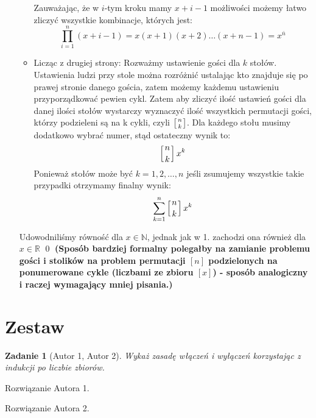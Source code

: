 \documentclass{mwart}
\newtheorem{zad}{Zadanie}[section]
\begin{document}
\begin{mdframed}
\begin{enumerate}
\begin{itemize}
              Zauważając, że w $i$-tym kroku mamy $x+i-1$ możliwości możemy 
              łatwo zliczyć wszystkie kombinacje, których jest:
            \[{\displaystyle \prod_{i=1}^{n} (x+i-1)} = x(x+1)(x+2)\dots(x+n-1) = x^{\bar{n}}\]
            \item Licząc z drugiej strony:
            Rozważmy ustawienie gości dla $k$ stołów. Ustawienia ludzi przy stole można rozróżnić ustalając kto znajduje się po prawej stronie danego gościa, zatem możemy każdemu ustawieniu przyporządkować pewien cykl.
            Zatem aby zliczyć ilość ustawień gości dla danej ilości stołów wystarczy wyznaczyć ilość wszystkich permutacji gości, którzy podzieleni są na k cykli, czyli  \(\left[n \atop k \right]\). Dla każdego stołu musimy dodatkowo wybrać numer, stąd ostateczny wynik to:
            \[\left[n \atop k \right] x^k\]
            Ponieważ stołów może być \(k = 1,2,\dots, n\) jeśli zsumujemy wszystkie takie przypadki otrzymamy finalny wynik:
            \[\sum_{k=1}^{n} \left[n \atop k \right] x^k\]
        \end{itemize}
        \bigskip
        Udowodniliśmy równość dla \( x \in \mathbb{N} \), jednak jak w 1. zachodzi ona również dla \( x \in \mathbb{R} \)
        \qed \bigskip
        \newline \textbf{(Sposób bardziej formalny polegałby na zamianie problemu gości i stolików na problem permutacji \(\left[ n \right] \) podzielonych na ponumerowane cykle (liczbami ze zbioru \(\left[ x \right] \)) - sposób analogiczny i raczej wymagający mniej pisania.)}
    \end{enumerate}
\end{mdframed}















\newpage
\section{Zestaw}          %

\begin{zad}[Autor 1, Autor 2]
    Wykaż zasadę włączeń i wyłączeń korzystając z indukcji po liczbie zbiorów.
\end{zad}
\begin{mdframed}
    Rozwiązanie Autora 1.
\end{mdframed}
\begin{mdframed}
    Rozwiązanie Autora 2.
\end{mdframed}
\end{document}
